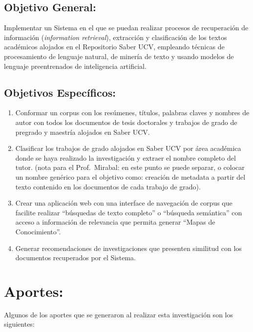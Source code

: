\documentclass[
  12pt,
  openany]{book}
\begin{document}
\hypertarget{objegeneral}{%
\subsection{Objetivo General:}\label{objegeneral}}

Implementar un Sistema en el que se puedan realizar procesos de recuperación de información (\emph{information retrieval}), extracción y clasificación de los textos académicos alojados en el Repositorio Saber UCV, empleando técnicas de procesamiento de lenguaje natural, de minería de texto y usando modelos de lenguaje preentrenados de inteligencia artificial.

\hypertarget{objeespe}{%
\subsection{Objetivos Específicos:}\label{objeespe}}

\begin{enumerate}
\def\labelenumi{\arabic{enumi}.}
\item
  Conformar un corpus con los resúmenes, títulos, palabras claves y nombres de autor con todos los documentos de tesis doctorales y trabajos de grado de pregrado y maestría alojados en Saber UCV.
\item
  Clasificar los trabajos de grado alojados en Saber UCV por área académica donde se haya realizado la investigación y extraer el nombre completo del tutor. (nota para el Prof.~Mirabal: en este punto se puede separar, o colocar un nombre genérico para el objetivo como: creación de metadata a partir del texto contenido en los documentos de cada trabajo de grado).
\item
  Crear una aplicación web con una interface de navegación de corpus que facilite realizar ``búsquedas de texto completo'' o ``búsqueda semántica'' con acceso a información de relevancia que permita generar ``Mapas de Conocimiento''.
\item
  Generar recomendaciones de investigaciones que presenten similitud con los documentos recuperados por el Sistema.
\end{enumerate}

\hypertarget{aporte}{%
\section{Aportes:}\label{aporte}}

Algunos de los aportes que se generaron al realizar esta investigación son los siguientes:
\end{document}
